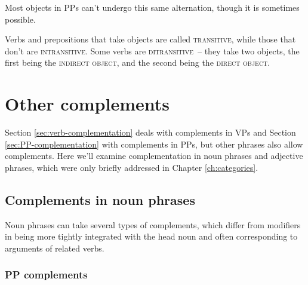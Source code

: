 Most objects in PPs can't undergo this same alternation, though it is sometimes possible.

\ea
    \z
\z
\ea
    \z
\z

Verbs and prepositions that take objects are called \textsc{transitive}, while those that don't are \textsc{intransitive}. Some verbs are \textsc{ditransitive}~-- they take two objects, the first being the \textsc{indirect object}, and the second being the \textsc{direct object}.

\ea
    \z
\z

\section{Other complements}

Section \ref{sec:verb-complementation} deals with complements in VPs and Section \ref{sec:PP-complementation} with complements in PPs, but other phrases also allow complements. Here we'll examine complementation in noun phrases and adjective phrases, which were only briefly addressed in Chapter \ref{ch:categories}.

\subsection{Complements in noun phrases}

Noun phrases can take several types of complements, which differ from modifiers in being more tightly integrated with the head noun and often corresponding to arguments of related verbs.

\subsubsection{PP complements}

